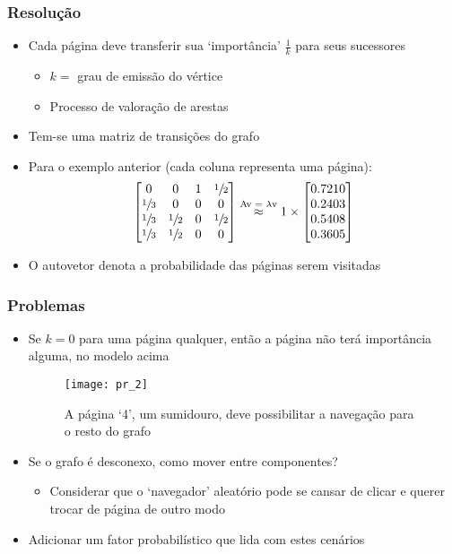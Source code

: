 \documentclass{beamer}
\begin{document}
\begin{frame}
    \frametitle{Resolução}
    \begin{itemize}
        \item Cada página deve transferir sua `importância' $\frac{1}{k}$ para
        seus sucessores
        \begin{itemize}
            \item $k =$ grau de emissão do vértice
            \item Processo de valoração de arestas
        \end{itemize}
        \item Tem-se uma matriz de transições do grafo
        \item Para o exemplo anterior (cada coluna representa uma página):
        \begin{equation*}
            \begin{bmatrix}
                0 & 0 & 1 & \sfrac{1}{2} \\
                \sfrac{1}{3} & 0 & 0 & 0 \\
                \sfrac{1}{3} & \sfrac{1}{2} & 0 & \sfrac{1}{2} \\
                \sfrac{1}{3} & \sfrac{1}{2} & 0 & 0
            \end{bmatrix} \stackrel{\text{Av = $\lambda$v}}{\approx}
            1 \times \begin{bmatrix}
                0.7210 \\ 0.2403 \\ 0.5408 \\ 0.3605
            \end{bmatrix}
        \end{equation*}
        \item O autovetor denota a probabilidade das páginas serem visitadas
    \end{itemize}
\end{frame}

\begin{frame}
    \frametitle{Problemas}
    \begin{itemize}
        \item Se $k = 0$ para uma página qualquer, então a página não terá
        importância alguma, no modelo acima
        \begin{figure}
            \texttt{[image: pr\_2]}
            \caption{\tiny{A página `4', um sumidouro, deve possibilitar a
            navegação para o resto do grafo}}
        \end{figure}
        \item Se o grafo é desconexo, como mover entre componentes?
        \begin{itemize}
            \item Considerar que o `navegador' aleatório pode se cansar de
            clicar e querer trocar de página de outro modo
        \end{itemize}
        \item Adicionar um fator probabilístico que lida com estes cenários
    \end{itemize}
\end{frame}
\end{document}
